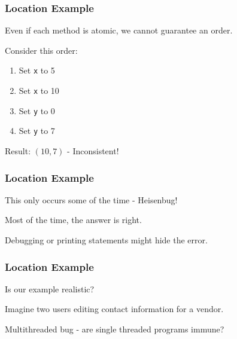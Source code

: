 \begin{frame}
\frametitle{Location Example}
\begin{changemargin}{1cm}
Even if each method is atomic, we cannot guarantee an order.

Consider this order:
\begin{enumerate}
	\item Set \texttt{x} to 5
	\item Set \texttt{x} to 10
	\item Set \texttt{y} to 0
	\item Set \texttt{y} to 7
\end{enumerate} 

Result: $(10, 7)$ - Inconsistent! 

\end{changemargin}
\end{frame}


\begin{frame}
\frametitle{Location Example}
\begin{changemargin}{1cm}
This only occurs some of the time - Heisenbug!

Most of the time, the answer is right.

Debugging or printing statements might hide the error.


\end{changemargin}
\end{frame}

\begin{frame}
\frametitle{Location Example}
\begin{changemargin}{1cm}
Is our example realistic?

Imagine two users editing contact information for a vendor.

Multithreaded bug - are single threaded programs immune?

\end{changemargin}
\end{frame}

